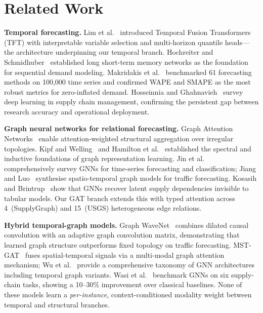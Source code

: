 
\section{Related Work}
\label{sec:related}

\textbf{Temporal forecasting.}
Lim et al.~\cite{lim2021tft} introduced Temporal Fusion
Transformers (TFT) with interpretable variable selection and
multi-horizon quantile heads---the architecture underpinning our
temporal branch. Hochreiter and Schmidhuber~\cite{hochreiter1997lstm}
established long short-term memory networks as the foundation for
sequential demand modeling. Makridakis et
al.~\cite{makridakis2022m5} benchmarked 61 forecasting methods
on 100{,}000 time series and confirmed WAPE and SMAPE as the
most robust metrics for zero-inflated demand. Hosseinnia and
Ghahnavieh~\cite{hosseinnia2023} survey deep learning in supply
chain management, confirming the persistent gap between research
accuracy and operational deployment.

\textbf{Graph neural networks for relational forecasting.}
Graph Attention Networks~\cite{velickovic2018gat} enable
attention-weighted structural aggregation over irregular topologies.
Kipf and Welling~\cite{kipf2017gcn} and Hamilton et
al.~\cite{hamilton2017graphsage} established the spectral and
inductive foundations of graph representation learning.
Jin et al.~\cite{jin2024survey} comprehensively survey GNNs
for time-series forecasting and classification; Jiang and
Luo~\cite{jiang2022gnn} synthesise spatio-temporal graph models
for traffic forecasting. Kosasih and
Brintrup~\cite{kosasih2022supply} show that GNNs recover latent
supply dependencies invisible to tabular models. Our GAT branch
extends this with typed attention across 4~(SupplyGraph) and
15~(USGS) heterogeneous edge relations.

\textbf{Hybrid temporal-graph models.}
Graph WaveNet~\cite{wu2019gwn} combines dilated causal convolution
with an adaptive graph convolution matrix, demonstrating that
learned graph structure outperforms fixed topology on traffic
forecasting. MST-GAT~\cite{ding2023mstgat} fuses spatial-temporal
signals via a multi-modal graph attention mechanism; Wu et
al.~\cite{wu2021gnn} provide a comprehensive taxonomy of GNN
architectures including temporal graph variants. Wasi et
al.~\cite{wasi2024gnn} benchmark GNNs on six supply-chain tasks,
showing a 10--30\% improvement over classical baselines. None of
these models learn a \emph{per-instance}, context-conditioned
modality weight between temporal and structural branches.

